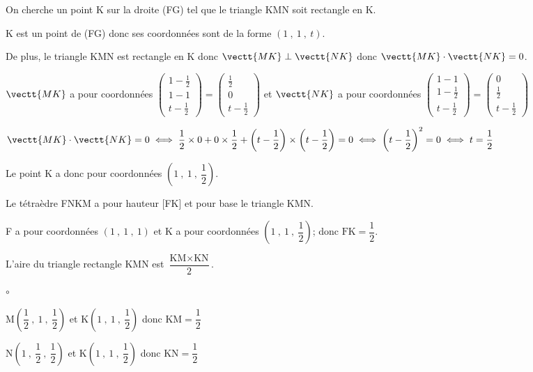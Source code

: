 \begin{enumerate}
On cherche un point K sur la droite (FG) tel que le triangle KMN soit rectangle en K.

K est un point de (FG) donc ses coordonnées sont de la forme $\left (1~,~1~,~t\right )$.

De plus, le triangle KMN est rectangle en K donc $\vectt{MK}\perp\vectt{NK}$ donc $\vectt{MK}\cdot\vectt{NK}=0$.

$\vectt{MK}$ a pour coordonnées
$\begin{pmatrix}
1-\frac{1}{2}\\1-1\\t-\frac{1}{2}
\end{pmatrix}
=
\begin{pmatrix}
\frac{1}{2}\\0\\t-\frac{1}{2}
\end{pmatrix}$
et
$\vectt{NK}$ a pour coordonnées
$\begin{pmatrix}
1-1\\1-\frac{1}{2}\\t-\frac{1}{2}
\end{pmatrix}
=
\begin{pmatrix}
0\\\frac{1}{2}\\t-\frac{1}{2}
\end{pmatrix}$

$\vectt{MK}\cdot\vectt{NK}=0
\iff \dfrac{1}{2}\times 0 + 0\times \dfrac{1}{2} + \left (t-\dfrac{1}{2}\right )\times \left (t-\dfrac{1}{2}\right ) = 0
\iff \left (t-\dfrac{1}{2}\right )^2=0
\iff t=\dfrac{1}{2}$

Le point K a donc pour coordonnées $\left (1~,~1~,~\dfrac{1}{2} \right )$.

\item 
Le tétraèdre FNKM a pour hauteur [FK] et pour base le triangle KMN.

\begin{list}{\textbullet}{}
\item F a pour coordonnées $\left (1~,~1~,~1\right )$ et K a pour coordonnées $\left (1~,~1~,~\dfrac{1}{2} \right )$; donc $\text{FK}=\dfrac{1}{2}$.

\item L'aire du triangle rectangle KMN est $\dfrac{\text{KM}\times\text{KN}}{2}$.

\begin{list}{$\circ$}{}
\item M\;$\left (\dfrac{1}{2}~,~1~,~\dfrac{1}{2} \right )$ et K\;$\left (1~,~1~,~\dfrac{1}{2} \right )$ donc $\text{KM}=\dfrac{1}{2}$
\item N\;$\left (1~,~\dfrac{1}{2}~,~\dfrac{1}{2} \right )$ et K\;$\left (1~,~1~,~\dfrac{1}{2} \right )$ donc $\text{KN}=\dfrac{1}{2}$
\end{list}


\end{list}
\end{enumerate}
